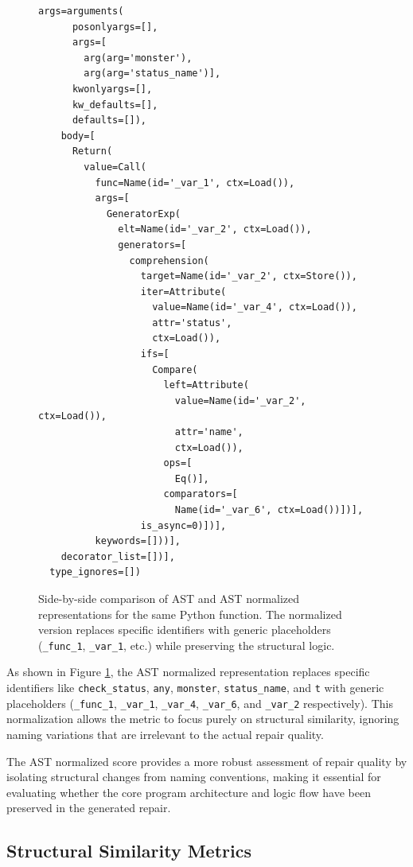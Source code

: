 \begin{figure}[h!]
\begin{minipage}{0.50\textwidth}
\begin{lstlisting}[basicstyle=\ttfamily\tiny, frame=single, breaklines=true]
    args=arguments(
      posonlyargs=[],
      args=[
        arg(arg='monster'),
        arg(arg='status_name')],
      kwonlyargs=[],
      kw_defaults=[],
      defaults=[]),
    body=[
      Return(
        value=Call(
          func=Name(id='_var_1', ctx=Load()),
          args=[
            GeneratorExp(
              elt=Name(id='_var_2', ctx=Load()),
              generators=[
                comprehension(
                  target=Name(id='_var_2', ctx=Store()),
                  iter=Attribute(
                    value=Name(id='_var_4', ctx=Load()),
                    attr='status',
                    ctx=Load()),
                  ifs=[
                    Compare(
                      left=Attribute(
                        value=Name(id='_var_2', ctx=Load()),
                        attr='name',
                        ctx=Load()),
                      ops=[
                        Eq()],
                      comparators=[
                        Name(id='_var_6', ctx=Load())])],
                  is_async=0)])],
          keywords=[]))],
    decorator_list=[])],
  type_ignores=[])
\end{lstlisting}
\end{minipage}
\caption{Side-by-side comparison of AST and AST normalized representations for the same Python function. The normalized version replaces specific identifiers with generic placeholders (\texttt{\_func\_1}, \texttt{\_var\_1}, etc.) while preserving the structural logic.}
\label{fig:ast-comparison}
\end{figure}

As shown in Figure \ref{fig:ast-comparison}, the AST normalized representation replaces specific identifiers like \texttt{check\_status}, \texttt{any}, \texttt{monster}, \texttt{status\_name}, and \texttt{t} with generic placeholders (\texttt{\_func\_1}, \texttt{\_var\_1}, \texttt{\_var\_4}, \texttt{\_var\_6}, and \texttt{\_var\_2} respectively). This normalization allows the metric to focus purely on structural similarity, ignoring naming variations that are irrelevant to the actual repair quality.

The AST normalized score provides a more robust assessment of repair quality by isolating structural changes from naming conventions, making it essential for evaluating whether the core program architecture and logic flow have been preserved in the generated repair.
\subsection{Structural Similarity Metrics}

